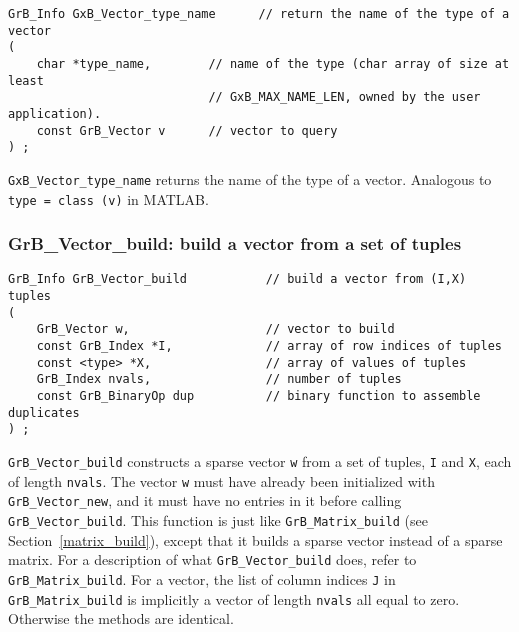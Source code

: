 \documentclass[12pt]{article}
\begin{document}
{\begin{mdframed}[userdefinedwidth=6in]
{\footnotesize
\begin{verbatim}
GrB_Info GxB_Vector_type_name      // return the name of the type of a vector
(
    char *type_name,        // name of the type (char array of size at least
                            // GxB_MAX_NAME_LEN, owned by the user application).
    const GrB_Vector v      // vector to query
) ;
\end{verbatim}
} \end{mdframed}

\verb'GxB_Vector_type_name' returns the name of the type of a vector.
Analogous to \verb'type = class (v)' in MATLAB.

\newpage
\subsubsection{{\sf GrB\_Vector\_build:}         build a vector from a set of tuples}
\label{vector_build}

\begin{mdframed}[userdefinedwidth=6in]
{\footnotesize
\begin{verbatim}
GrB_Info GrB_Vector_build           // build a vector from (I,X) tuples
(
    GrB_Vector w,                   // vector to build
    const GrB_Index *I,             // array of row indices of tuples
    const <type> *X,                // array of values of tuples
    GrB_Index nvals,                // number of tuples
    const GrB_BinaryOp dup          // binary function to assemble duplicates
) ;
\end{verbatim}
} \end{mdframed}

\verb'GrB_Vector_build' constructs a sparse vector \verb'w' from a set of
tuples, \verb'I' and \verb'X', each of length \verb'nvals'.  The vector
\verb'w' must have already been initialized with \verb'GrB_Vector_new', and it
must have no entries in it before calling \verb'GrB_Vector_build'.
This function is just like \verb'GrB_Matrix_build' (see
Section~\ref{matrix_build}), except that it builds a sparse vector instead of a
sparse matrix.  For a description of what \verb'GrB_Vector_build' does, refer
to \verb'GrB_Matrix_build'.  For a vector, the list of column indices \verb'J'
in \verb'GrB_Matrix_build' is implicitly a vector of length \verb'nvals' all
equal to zero.  Otherwise the methods are identical.

}
\end{document}
